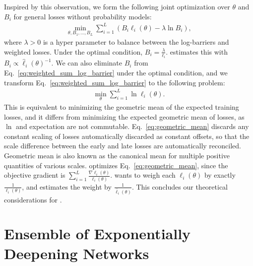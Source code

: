 Inspired by this observation, we form the following joint optimization over $\theta$ and $B_i$ for general losses without probability models:
\begin{align}
    \min _{\theta, B_1,...,B_L} \sum _{i=1}^L (B_i \ell _i(\theta) - \lambda \ln B_i),
    \label{eq:weighted_sum_log_barrier}
\end{align}
where $\lambda > 0$ is a hyper parameter to balance between the log-barriers and weighted losses. Under the optimal condition, $B_i=\frac{\lambda}{\ell_i}$. \adaloss estimates this with $B_i \propto \hat{\ell}_i(\theta)^{-1}$.  
We can also eliminate $B_i$ from Eq.~\ref{eq:weighted_sum_log_barrier} under the optimal condition, and we transform Eq.~\ref{eq:weighted_sum_log_barrier} to the following problem:
\begin{align}
    \min _{\theta} \sum _{i=1}^L \ln \ell _i (\theta).
    \label{eq:geometric_mean}
\end{align}
This is equivalent to minimizing the geometric mean of the expected training losses, and it differs from minimizing the expected geometric mean of losses, as $\ln$ and expectation are not commutable. 
Eq.~\ref{eq:geometric_mean} discards any constant scaling of losses automatically discarded as constant offsets, so that the scale difference between the early and late losses are automatically reconciled. Geometric mean is also known as the canonical mean for multiple positive quantities of various scales. \adaloss optimizes  Eq.~\ref{eq:geometric_mean}, since the objective gradient is $\sum _{i=1}^L \frac{ \nabla \ell _i (\theta)} {\ell_i (\theta)}$. \adaloss wants to weigh each $\ell_i(\theta)$ by exactly $\frac{1}{{\ell}_i (\theta) }$, and estimates the weight by $\frac{1}{\hat {\ell}_i (\theta) }$.
This concludes our theoretical considerations for \adaloss.







\section{Ensemble of Exponentially Deepening Networks}
\label{sec:eann}


